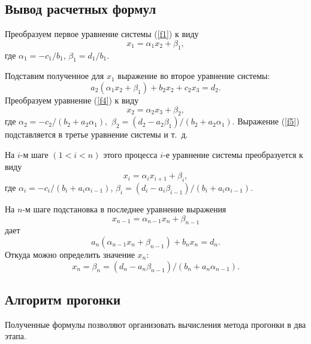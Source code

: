 \documentclass[12pt]{article}
\begin{document}
    \subsection*{Вывод расчетных формул}

    Преобразуем первое уравнение системы (\ref{f1}) к виду
    \begin{equation}
        x_1=\alpha_1 x_2+\beta_1,
    \end{equation}
    где $\alpha_1=-c_1/b_1$, $\beta_1=d_1/b_1$.

    Подставим полученное для $x_1$ выражение во второе уравнение системы:
    \begin{equation}
        a_2\left(\alpha_1 x_2+\beta_1\right)+b_2 x_2+c_2 x_3 = d_2.\label{f4}
    \end{equation}
    Преобразуем уравнение (\ref{f4}) к виду
    \begin{equation}
        x_2=\alpha_2 x_3 +\beta_2,\label{f5}
    \end{equation}
    где $\alpha_2=-c_2/\left(b_2+a_2\alpha_1\right),$ $\beta_2=\left(d_2-a_2\beta_1\right)/\left(b_2+a_2\alpha_1\right)$.
    Выражение (\ref{f5}) подставляется в третье уравнение системы и т.~д.

    На $i$-м шаге $\left(1<i<n\right)$ этого процесса $i$-е уравнение системы преобразуется к виду
    \begin{equation}
        x_i=\alpha_i x_{i+1}+\beta_i,
    \end{equation}
    где $\alpha_i=-c_i/\left(b_i+a_i \alpha_{i-1}\right)$, $\beta_i=\left(d_i-a_i\beta_{i-1}\right)/\left(b_i+a_i\alpha_{i-1}\right)$.

    На $n$-м шаге подстановка в последнее уравнение выражения $$x_{n-1}=\alpha_{n-1}x_n+\beta_{n-1}$$ дает
    \begin{equation}
        a_n\left(\alpha_{n-1}x_n+\beta_{n-1}\right)+b_n x_n =d_n.
    \end{equation}
    Откуда можно определить значение $x_n$:
    \begin{equation}
        x_n=\beta_n=\left(d_n-a_n\beta_{n-1}\right)/\left(b_n+a_n\alpha_{n-1}\right).
    \end{equation}

    \subsection*{Алгоритм прогонки}
    Полученные формулы позволяют организовать вычисления метода прогонки в два этапа.
\end{document}
